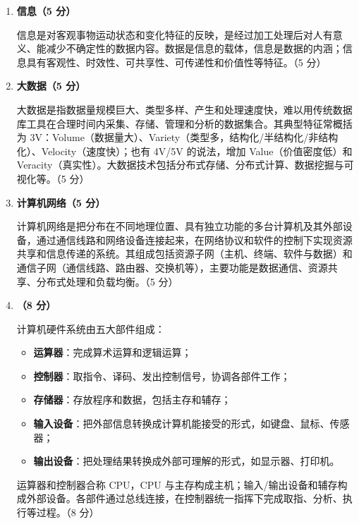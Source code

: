 \documentclass[a4paper,11pt]{article}
\begin{document}

\begin{enumerate}[start=29, label=\textbf{\arabic*.}, leftmargin=2.4em, itemsep=0.55em]

\item \textbf{信息（5 分）}

信息是对客观事物运动状态和变化特征的反映，是经过加工处理后对人有意义、能减少不确定性的数据内容。数据是信息的载体，信息是数据的内涵；信息具有客观性、时效性、可共享性、可传递性和价值性等特征。\hfill（5 分）

\item \textbf{大数据（5 分）}

大数据是指数据量规模巨大、类型多样、产生和处理速度快，难以用传统数据库工具在合理时间内采集、存储、管理和分析的数据集合。其典型特征常概括为 3V：Volume（数据量大）、Variety（类型多，结构化/半结构化/非结构化）、Velocity（速度快）；也有 4V/5V 的说法，增加 Value（价值密度低）和 Veracity（真实性）。大数据技术包括分布式存储、分布式计算、数据挖掘与可视化等。\hfill（5 分）

\item \textbf{计算机网络（5 分）}

计算机网络是把分布在不同地理位置、具有独立功能的多台计算机及其外部设备，通过通信线路和网络设备连接起来，在网络协议和软件的控制下实现资源共享和信息传递的系统。其组成包括资源子网（主机、终端、软件与数据）和通信子网（通信线路、路由器、交换机等），主要功能是数据通信、资源共享、分布式处理和负载均衡。\hfill（5 分）

\item \textbf{（8 分）}

计算机硬件系统由五大部件组成：
\begin{itemize}[leftmargin=1.8em, itemsep=1pt]
  \item \textbf{运算器}：完成算术运算和逻辑运算；
  \item \textbf{控制器}：取指令、译码、发出控制信号，协调各部件工作；
  \item \textbf{存储器}：存放程序和数据，包括主存和辅存；
  \item \textbf{输入设备}：把外部信息转换成计算机能接受的形式，如键盘、鼠标、传感器；
  \item \textbf{输出设备}：把处理结果转换成外部可理解的形式，如显示器、打印机。
\end{itemize}
运算器和控制器合称 CPU，CPU 与主存构成主机；输入/输出设备和辅存构成外部设备。各部件通过总线连接，在控制器统一指挥下完成取指、分析、执行等过程。\hfill（8 分）


\end{enumerate}
\end{document}
